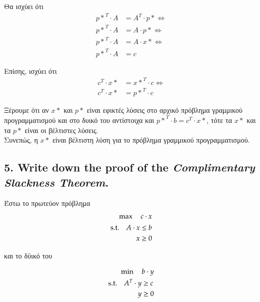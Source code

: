 \documentclass[12pt]{article}
\begin{document}
Θα ισχύει ότι \\

\begin{align*}
	{p*}^{T} \cdot A &= A^{T} \cdot {p*} \Leftrightarrow \\
	{p*}^{T} \cdot A &= A \cdot {p*} \Leftrightarrow \\
	{p*}^{T} \cdot A &= A \cdot {x*} \Leftrightarrow \\
	{p*}^{T} \cdot A &= c
\end{align*}

Επίσης, ισχύει ότι \\

\begin{align*}
	c^{T} \cdot {x*} &= {x*}^{T} \cdot c \Leftrightarrow \\
	c^{T} \cdot {x*} &= {p*}^{T} \cdot c 	
\end{align*}

Ξέρουμε ότι αν \({x*}\) και \({p*}\) είναι εφικτές λύσεις στο αρχικό πρόβλημα γραμμικού προγραμματισμού και στο δυικό του αντίστοιχα και \({p*}^{T} \cdot b = c^{T} \cdot {x*}\), τότε τα \({x*}\) και τα \({p*}\) είναι οι βέλτιστες λύσεις. \\

Συνεπώς, η \({x*}\) είναι βέλτιστη λύση για το πρόβλημα γραμμικού προγραμματισμού.

\vspace{2in}

\pagebreak

\subsection*{5. Write down the proof of the \textit{Complimentary Slackness Theorem}.}

Έστω το πρωτεύον πρόβλημα \\

\begin{align*}
    \max \quad c \cdot x \\
    \begin{aligned}
    	\textup{s.t.}\quad
 		A \cdot x & \leq b \\
		x & \geq 0
    \end{aligned}
\end{align*}

και το δϋικό του

\begin{align*}
    \min \quad b \cdot y \\
    \begin{aligned}
    	\textup{s.t.}\quad
   		A^T \cdot y & \geq c \\
		y & \geq 0
    \end{aligned}
\end{align*}
\end{document}
